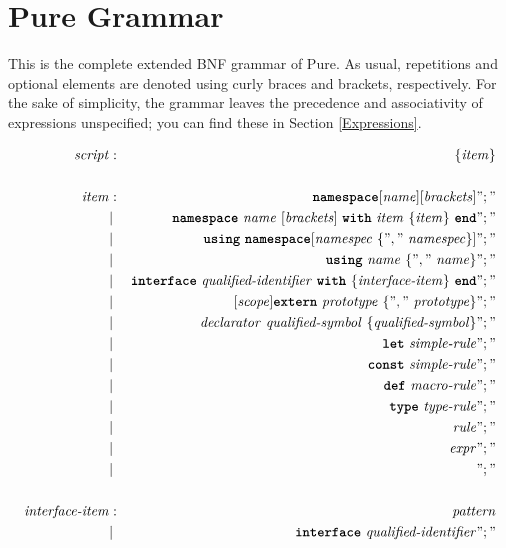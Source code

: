 \documentclass[a4paper,12pt]{article}
\newcommand{\kw}[1]{\texttt{\textbf{#1}}}
\newcommand{\nt}[1]{\textrm{\textit{#1\/}}}
\begin{document}
\pagebreak


\printindex

\pagebreak
\appendix
\section{Pure Grammar}
\label{Grammar}

This is the complete extended BNF grammar of Pure. As usual, repetitions and optional elements are denoted using curly braces and brackets, respectively. For the sake of simplicity, the grammar leaves the precedence and associativity of expressions unspecified; you can find these in Section \ref{Expressions}.

\begin{bnf}
\begin{eqnarray*}
\nt{script}	&:& \{ \nt{item} \}\\
\\
\nt{item}	&:& \kw{namespace} [ \nt{name} ] [ \nt{brackets} ] ";" \\
		&|& \kw{namespace}\ \nt{name}\  [ \nt{brackets} ]\ \kw{with}\ \nt{item}\ \{ \nt{item} \}\ \kw{end} ";" \\
		&|& \kw{using}\ \kw{namespace} [ \nt{namespec}\ \{ ","\ \nt{namespec} \} ] ";" \\
		&|& \kw{using}\ \nt{name}\ \{ ","\ \nt{name} \} ";" \\
		&|& \kw{interface}\ \nt{qualified-identifier}\ \kw{with}\ \{ \nt{interface-item} \}\ \kw{end} ";" \\
		&|& [ \nt{scope} ] \kw{extern}\ \nt{prototype}\ \{ ","\ \nt{prototype} \} ";" \\
		&|& \nt{declarator}\ \nt{qualified-symbol}\ \{ \nt{qualified-symbol} \} ";" \\
		&|& \kw{let}\ \nt{simple-rule} ";" \\
		&|& \kw{const}\ \nt{simple-rule} ";" \\
		&|& \kw{def}\ \nt{macro-rule} ";" \\
		&|& \kw{type}\ \nt{type-rule} ";" \\
		&|& \nt{rule} ";" \\
		&|& \nt{expr} ";" \\
		&|& ";" \\
\\
\nt{interface-item} &:& \nt{pattern} \\
		&|& \kw{interface}\ \nt{qualified-identifier} ";" \\
\\

\end{eqnarray*}
\end{bnf}
\end{document}
